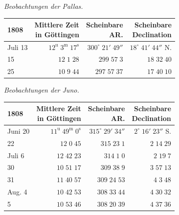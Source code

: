 \begin{center}
\emph{Beobachtungen der Pallas.}
\end{center}


\begin{center}\fontsize{10}{12}\selectfont\setlength{\tabcolsep}{3pt}\renewcommand{\arraystretch}{1.15}\begin{tabular}{lrrr}
1808 & \shortstack{Mittlere Zeit\\in Göttingen} & \shortstack{Scheinbare\\AR.} & \shortstack{Scheinbare\\Declination}\\\hline
Juli 13 & $12^{\text{u}}\;3^{\text{m}}\;17^{\text{s}}$ & $300^\circ\;21'\;49''$ & $18^\circ\;41'\;44''$ N.\\
15 & $12\;1\;28$ & $299\;57\;3$ & $18\;32\;40$\\
25 & $10\;9\;44$ & $297\;57\;37$ & $17\;40\;10$\\
\end{tabular}\end{center}


\begin{center}
\emph{Beobachtungen der Juno.}
\end{center}


\begin{center}\fontsize{10}{12}\selectfont\setlength{\tabcolsep}{3pt}\renewcommand{\arraystretch}{1.15}\begin{tabular}{lrrr}
1808 & \shortstack{Mittlere Zeit\\in Göttingen} & \shortstack{Scheinbare\\AR.} & \shortstack{Scheinbare\\Declination}\\\hline
Juni 20 & $11^{\text{u}}\;49^{\text{m}}\;0^{\text{s}}$ & $315^\circ\;29'\;34''$ & $2^\circ\;16'\;23''$ S.\\
22 & $12\;0\;45$ & $315\;23\;1$ & $2\;14\;29$\\
Juli 6 & $12\;42\;23$ & $314\;1\;0$ & $2\;19\;7$\\
30 & $10\;51\;17$ & $309\;38\;9$ & $3\;57\;13$\\
31 & $11\;40\;57$ & $309\;24\;53$ & $4\;3\;48$\\
Aug. 4 & $10\;42\;53$ & $308\;33\;44$ & $4\;30\;32$\\
5 & $10\;53\;46$ & $308\;20\;39$ & $4\;37\;36$\\
\end{tabular}\end{center}


